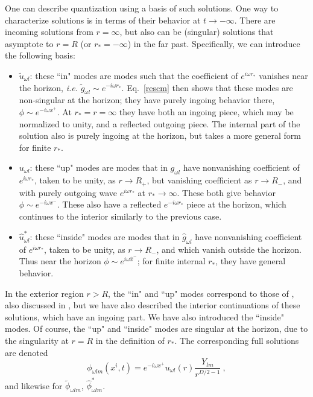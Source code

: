\documentclass[11pt]{article}
\numberwithin{equation}{section}
\newcommand{\beq}{\begin{equation}}
\newcommand{\eeq}{\end{equation}}
\begin{document}
One can describe quantization using a basis of such solutions. One way to characterize solutions is in terms of their behavior at $t\rightarrow-\infty$.  There are incoming solutions from $r=\infty$, but also can be (singular) solutions that asymptote to $r=R$ (or $r_*=-\infty$) in the far past.  Specifically, we can introduce the following basis:
\begin{itemize}
\item{$\tilde u_{\omega l}$}: these ``in" modes are modes such that the coefficient of $e^{i\omega r_*}$ vanishes near the horizon, {\it i.e.} $\tilde g_{\omega l}\sim e^{-i\omega r_*}$.  Eq.~\eqref{rescm} then shows that these modes are non-singular at the horizon; they have purely ingoing behavior there, $\phi\sim e^{-i\omega x^+}$.  At $r_*=r=\infty$ they have both an ingoing piece, which may be normalized to unity, and a reflected outgoing piece.  The internal part of the solution also is purely ingoing at the horizon, but takes a more general form for finite $r_*$.    
\item{$u_{\omega l}$}: these ``up" modes are modes that in $g_{\omega l}$ have nonvanishing coefficient of $e^{i\omega r_*}$, taken to be unity, as $r\rightarrow R_+$, but vanishing coefficient as $r\rightarrow R_-$, and with purely outgoing wave $e^{i\omega r_*}$ at $r_*\rightarrow \infty$.  These both give behavior $\phi\sim e^{-i \omega x^-}$.  These also have a reflected $e^{-i\omega r_*}$ piece at the horizon, which continues to the interior similarly to the previous case. 
\item{$\hat u^*_{\omega l}$}:  these ``inside" modes are modes that in $\hat g_{\omega l}$ have nonvanishing coefficient of $e^{i\omega r_*}$, taken to be unity, as $r\rightarrow R_-$, and which vanish outside the horizon.  
Thus near the horizon $\phi\sim e^{i\omega \hat x^-}$; 
for finite internal $r_*$, they  have general behavior.
\end{itemize} 
In the exterior region $r>R$,  the ``in" and ``up" modes  correspond to those of \cite{ChMi}, also discussed in \cite{GiSh2}, but we have also described the interior continuations of these solutions, which have an  ingoing part.  We have also introduced the ``inside" modes.  
Of course, the ``up" and ``inside" modes are singular at the horizon, due to the singularity at $r=R$ in the definition of $r_*$.   The corresponding full solutions are denoted
\beq\label{EEigenmodes}
\phi_{\omega l m}(x^i,t) 
= e^{-i\omega x^+} u_{\omega l}(r)  \frac{Y_{lm}}{r^{D/2-1}}\ ,
\eeq
and likewise for $\tilde\phi_{\omega lm}$, $\hat\phi^*_{\omega lm}$. 
\end{document}
